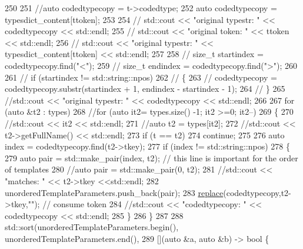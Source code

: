 \begin{DoxyCode}
250 
251         \textcolor{comment}{//auto codedtypecopy = t->codedtype;}
252         \textcolor{keyword}{auto} codedtypecopy = typesdict\_content[ttoken];
253 
254         \textcolor{comment}{// std::cout << "original typestr: " << codedtypecopy << std::endl;}
255         \textcolor{comment}{// std::cout << "original token: " << ttoken << std::endl;}
256         \textcolor{comment}{// std::cout << "original typestr: " << typesdict\_content[ttoken] << std::endl;}
257 
258         \textcolor{comment}{// size\_t startindex = codedtypecopy.find("<");}
259         \textcolor{comment}{// size\_t endindex = codedtypecopy.find(">");}
260 
261         \textcolor{comment}{// if (startindex != std::string::npos)}
262         \textcolor{comment}{// \{}
263         \textcolor{comment}{//     codedtypecopy = codedtypecopy.substr(startindex + 1, endindex - startindex - 1);}
264         \textcolor{comment}{// \}}
265         \textcolor{comment}{//std::cout << "original typestr: " << codedtypecopy << std::endl;}
266 
267         \textcolor{keywordflow}{for} (\textcolor{keyword}{auto} &t2 : types)
268         \textcolor{comment}{//for (auto it2= types.size() -1; it2 >=0; it2--)}
269         \{
270             \textcolor{comment}{//std::cout << it2 << std::endl;}
271             \textcolor{comment}{//auto t2 = types[it2];}
272             \textcolor{comment}{//std::cout << t2->getFullName() << std::endl;}
273             \textcolor{keywordflow}{if} (t == t2)
274                 \textcolor{keywordflow}{continue};
275 
276             \textcolor{keyword}{auto} index = codedtypecopy.find(t2->tkey);
277             \textcolor{keywordflow}{if} (index != std::string::npos)
278             \{
279                 \textcolor{keyword}{auto} pair = std::make\_pair(index, t2); \textcolor{comment}{// this line is important for the order of templates}
280                 \textcolor{comment}{//auto pair = std::make\_pair(0, t2);}
281                 \textcolor{comment}{//std::cout << "matches: " << t2->tkey <<std::endl;}
282                 unorderedTemplateParameters.push\_back(pair);
283                 \hyperlink{namespacesmacc_1_1introspection_a48571b9bf3b115d2a83cc0147c96d0bd}{replace}(codedtypecopy,t2->tkey,\textcolor{stringliteral}{""}); \textcolor{comment}{// consume token}
284                 \textcolor{comment}{//std::cout << "codedtypecopy: " << codedtypecopy << std::endl;}
285             \}
286         \}
287 
288         std::sort(unorderedTemplateParameters.begin(), unorderedTemplateParameters.end(),
289                   [](\textcolor{keyword}{auto} &a, \textcolor{keyword}{auto} &b) -> \textcolor{keywordtype}{bool} \{

\end{DoxyCode}
